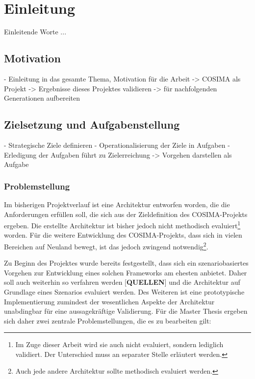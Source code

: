 
\chapter{Einleitung} %
\label{cha:einleitung}

  Einleitende Worte ...

\section{Motivation} %
\label{sec:motivation}

  - Einleitung in das gesamte Thema, Motivation für die Arbeit
    -> COSIMA als Projekt
    -> Ergebnisse dieses Projektes validieren
    -> für nachfolgenden Generationen aufbereiten


\section{Zielsetzung und Aufgabenstellung} %
\label{sec:zielsetzung_und_aufgabenstellung}

- Strategische Ziele definieren
- Operationalisierung der Ziele in Aufgaben
- Erledigung der Aufgaben führt zu Zielerreichung
  -> Vorgehen darstellen als Aufgabe

\subsection{Problemstellung} %
\label{ssec:problemstellung}

  Im bisherigen Projektverlauf ist eine Architektur entworfen worden, die die Anforderungen erfüllen soll, die sich aus der Zieldefinition des COSIMA-Projekts ergeben. Die erstellte Architektur ist bisher jedoch nicht methodisch evaluiert\footnote{Im Zuge dieser Arbeit wird sie auch nicht evaluiert, sondern lediglich validiert. Der Unterschied muss an separater Stelle erläutert werden.} worden. Für die weitere Entwicklung des COSIMA-Projekts, dass sich in vielen Bereichen auf Neuland bewegt, ist das jedoch zwingend notwendig\footnote{Auch jede andere Architektur sollte methodisch evaluiert werden.}.
  
  Zu Beginn des Projektes wurde bereits festgestellt, dass sich ein szenariobasiertes Vorgehen zur Entwicklung eines solchen Frameworks am ehesten anbietet. Daher soll auch weiterhin so verfahren werden [\textbf{QUELLEN}] und die Architektur auf Grundlage eines Szenarios evaluiert werden. Des Weiteren ist eine prototypische Implementierung zumindest der wesentlichen Aspekte der Architektur unabdingbar für eine aussagekräftige Validierung. Für die Master Thesis ergeben sich daher zwei zentrale Problemstellungen, die es zu bearbeiten gilt:
  
